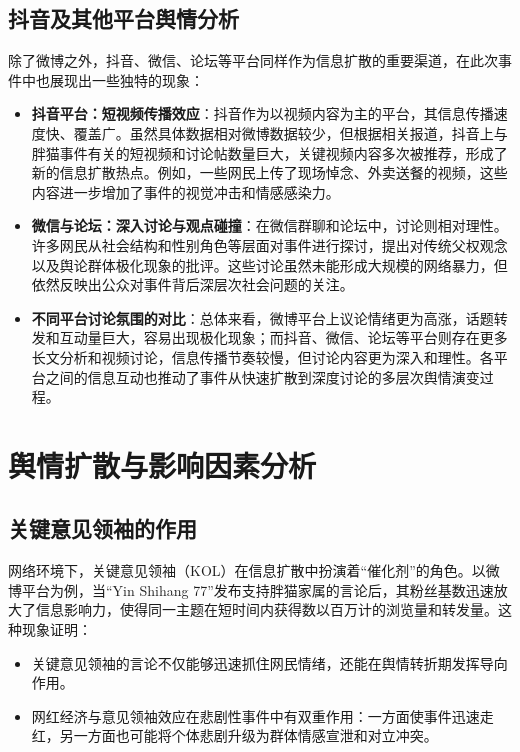 \documentclass{article}
\begin{document}
\subsection{抖音及其他平台舆情分析}
除了微博之外，抖音、微信、论坛等平台同样作为信息扩散的重要渠道，在此次事件中也展现出一些独特的现象：
\begin{itemize}
    \item \textbf{抖音平台：短视频传播效应}：抖音作为以视频内容为主的平台，其信息传播速度快、覆盖广。虽然具体数据相对微博数据较少，但根据相关报道，抖音上与胖猫事件有关的短视频和讨论帖数量巨大，关键视频内容多次被推荐，形成了新的信息扩散热点。例如，一些网民上传了现场悼念、外卖送餐的视频，这些内容进一步增加了事件的视觉冲击和情感感染力。
    \item \textbf{微信与论坛：深入讨论与观点碰撞}：在微信群聊和论坛中，讨论则相对理性。许多网民从社会结构和性别角色等层面对事件进行探讨，提出对传统父权观念以及舆论群体极化现象的批评。这些讨论虽然未能形成大规模的网络暴力，但依然反映出公众对事件背后深层次社会问题的关注。
    \item \textbf{不同平台讨论氛围的对比}：总体来看，微博平台上议论情绪更为高涨，话题转发和互动量巨大，容易出现极化现象；而抖音、微信、论坛等平台则存在更多长文分析和视频讨论，信息传播节奏较慢，但讨论内容更为深入和理性。各平台之间的信息互动也推动了事件从快速扩散到深度讨论的多层次舆情演变过程。
\end{itemize}

\section{舆情扩散与影响因素分析}
\subsection{关键意见领袖的作用}
网络环境下，关键意见领袖（KOL）在信息扩散中扮演着“催化剂”的角色。以微博平台为例，当“Yin Shihang 77”发布支持胖猫家属的言论后，其粉丝基数迅速放大了信息影响力，使得同一主题在短时间内获得数以百万计的浏览量和转发量。这种现象证明：
\begin{itemize}
    \item 关键意见领袖的言论不仅能够迅速抓住网民情绪，还能在舆情转折期发挥导向作用。
    \item 网红经济与意见领袖效应在悲剧性事件中有双重作用：一方面使事件迅速走红，另一方面也可能将个体悲剧升级为群体情感宣泄和对立冲突。
\end{itemize}
\end{document}
